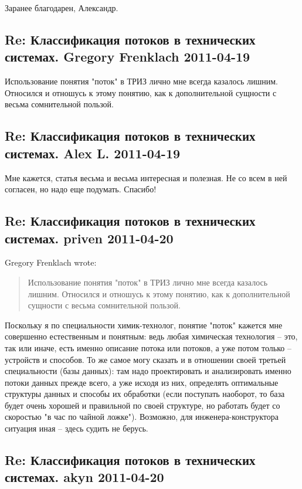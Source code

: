 \documentclass[a4paper,11pt]{article}
\begin{document}
Заранее благодарен,
Александр.

\subsection*{Re: Классификация потоков в технических системах. Gregory
  Frenklach 2011-04-19}
  
Использование понятия "поток" в ТРИЗ лично мне всегда казалось лишним.
Относился и отношусь к этому понятию, как к дополнительной сущности с весьма
сомнительной пользой.

\subsection*{Re: Классификация потоков в технических системах. Alex L.
  2011-04-19} 

Мне кажется, статья весьма и весьма интересная и полезная. Не со всем в ней
согласен, но надо еще подумать. Спасибо!

\subsection*{Re: Классификация потоков в технических системах. priven
  2011-04-20} 

Gregory Frenklach wrote:
\begin{quote}      
  Использование понятия "поток" в ТРИЗ лично мне всегда казалось лишним.
  Относился и отношусь к этому понятию, как к дополнительной сущности с весьма
  сомнительной пользой.
\end{quote}

Поскольку я по специальности химик-технолог, понятие "поток" кажется мне
совершенно естественным и понятным: ведь любая химическая технология -- это,
так или иначе, есть именно описание потока или потоков, а уже потом только --
устройств и способов. То же самое могу сказать и в отношении своей третьей
специальности (базы данных): там надо проектировать и анализировать именно
потоки данных прежде всего, а уже исходя из них, определять оптимальные
структуры данных и способы их обработки (если поступать наоборот, то база
будет очень хорошей и правильной по своей структуре, но работать будет со
скоростью "в час по чайной ложке"). Возможно, для инженера-конструктора
ситуация иная -- здесь судить не берусь.

\subsection*{Re: Классификация потоков в технических системах. akyn
  2011-04-20}
\end{document}
